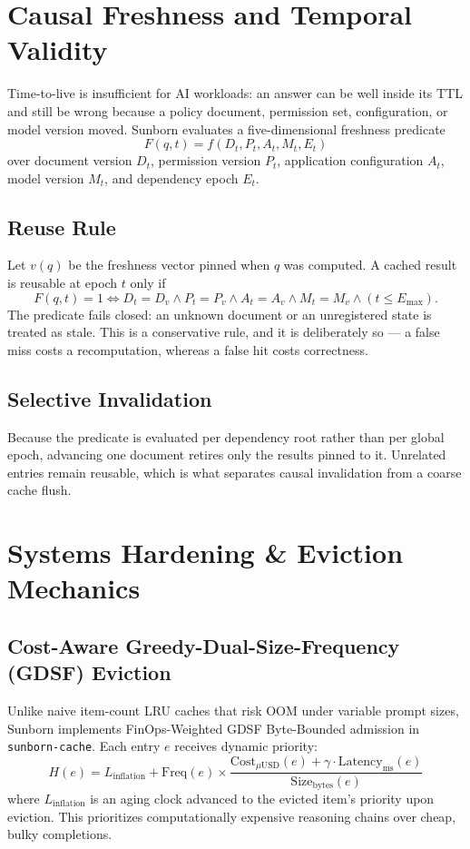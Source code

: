 \documentclass[conference]{IEEEtran}
\begin{document}
\section{Causal Freshness and Temporal Validity}
Time-to-live is insufficient for AI workloads: an answer can be well inside its TTL and still be wrong because a policy document, permission set, configuration, or model version moved. Sunborn evaluates a five-dimensional freshness predicate
\begin{equation}
F(q,t) = f(D_t, P_t, A_t, M_t, E_t)
\end{equation}
over document version $D_t$, permission version $P_t$, application configuration $A_t$, model version $M_t$, and dependency epoch $E_t$.

\subsection{Reuse Rule}
Let $v(q)$ be the freshness vector pinned when $q$ was computed. A cached result is reusable at epoch $t$ only if
\begin{equation}
F(q,t) = 1 \iff D_t = D_{v} \land P_t = P_{v} \land A_t = A_{v} \land M_t = M_{v} \land (t \le E_{\max}).
\end{equation}
The predicate fails closed: an unknown document or an unregistered state is treated as stale. This is a conservative rule, and it is deliberately so --- a false miss costs a recomputation, whereas a false hit costs correctness.

\subsection{Selective Invalidation}
Because the predicate is evaluated per dependency root rather than per global epoch, advancing one document retires only the results pinned to it. Unrelated entries remain reusable, which is what separates causal invalidation from a coarse cache flush.

\section{Systems Hardening \& Eviction Mechanics}
\subsection{Cost-Aware Greedy-Dual-Size-Frequency (GDSF) Eviction}
Unlike naive item-count LRU caches that risk OOM under variable prompt sizes, Sunborn implements FinOps-Weighted GDSF Byte-Bounded admission in \texttt{sunborn-cache}. Each entry $e$ receives dynamic priority:
\begin{equation}
    H(e) = L_{\text{inflation}} + \text{Freq}(e) \times \frac{\text{Cost}_{\mu\text{USD}}(e) + \gamma \cdot \text{Latency}_{\text{ms}}(e)}{\text{Size}_{\text{bytes}}(e)}
\end{equation}
where $L_{\text{inflation}}$ is an aging clock advanced to the evicted item's priority upon eviction. This prioritizes computationally expensive reasoning chains over cheap, bulky completions.
\end{document}
